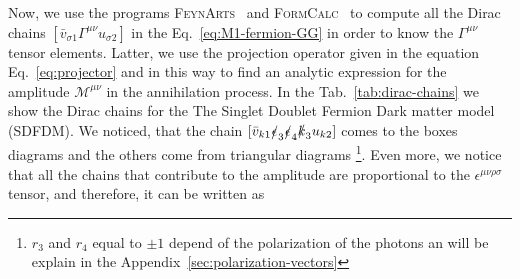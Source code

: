 Now, we use the programs \textsc{FeynArts}~\cite{Hahn:2000kx} and \textsc{FormCalc}~\cite{Hahn:1998yk} to compute all the Dirac chains $\left[\bar{v}_{\sigma 1}\Gamma^{\mu\nu}u_{\sigma 2}\right]$ in the Eq.~\eqref{eq:M1-fermion-GG} in order to know the $\Gamma^{\mu\nu}$ tensor elements. Latter, we use the projection operator given in the equation Eq.~\eqref{eq:projector} and in this way  to find an analytic expression for the amplitude $\mathcal{M}^{\mu\nu}$ in the annihilation process. In the Tab.~\ref{tab:dirac-chains} we show the Dirac chains for the The Singlet Doublet Fermion Dark matter model (SDFDM). We noticed, that the chain $[\bar{v}_{k1}\slashed{\epsilon}_3\slashed{\epsilon}_4\slashed{k}_3u_{k2}]$ comes to the boxes diagrams and the others come from triangular diagrams \footnote{$r_3$ and $r_4$ equal to $\pm 1$ depend of the polarization of the photons an will be explain in the Appendix~\ref{sec:polarization-vectors}}. Even more, we notice that all the chains that contribute to the amplitude are proportional to the $\epsilon^{\mu\nu\rho\sigma}$ tensor, and therefore, it can be written as
%
